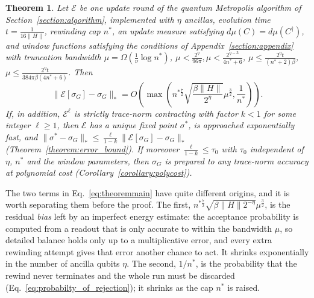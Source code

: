 \documentclass[aps,floatfix,10pt,amssymb,amsfont,amsmath,superscriptaddress,float,nofootinbib,longbibliography,nobalancelastpage,twocolumn]{revtex4-2}
\newtheorem{theorem}{Theorem}
\begin{document}
\begin{theorem}
\label{theorem:main}
Let $\mathcal{E}$ be one update round of the quantum Metropolis algorithm of Section~\ref{section:algorithm}, implemented with $\eta$ ancillas, evolution time $t = \frac{1}{16\|H\|}$, rewinding cap $n^*$, an update measure satisfying $d\mu(C)=d\mu(C^{\dagger})$, and window functions satisfying the conditions of Appendix~\ref{section:appendix} with truncation bandwidth $\mu = \Omega(\frac{1}{\nu}\log n^*)$, $\mu < \frac{2^{\eta}}{96\pi}, \mu < \frac{2^{\eta-3}}{4n^*+6}$, $\mu \leq \frac{2^{\eta}t}{(n^*+2)\beta}$, $\mu \leq \frac{2^{\eta}t}{384\pi\beta(4n^*+6)}$. Then
\begin{equation}
   \|\mathcal{E}[\sigma_G] - \sigma_G\|_* = O\left(\max\left( n^{*\frac{7}{2}}\sqrt{\frac{\beta\|H\| }{2^{\eta}}}\mu^{\frac{3}{2}},\frac{1}{n^*}\right)\right).
\label{eq:theoremmain}
\end{equation}
If, in addition, $\mathcal{E}^{\ell}$ is strictly trace-norm contracting with factor $k<1$ for some integer $\ell\geq1$, then $\mathcal{E}$ has a unique fixed point $\sigma^*$, is approached exponentially fast, and $\|\sigma^*-\sigma_G\|_* \leq \frac{\ell}{1-k}\|\mathcal{E}[\sigma_G] - \sigma_G\|_*$ (Theorem~\ref{theorem:error_bound}). If moreover $\frac{\ell}{1-k}\leq\tau_0$ with $\tau_0$ independent of $\eta$, $n^*$ and the window parameters, then $\sigma_G$ is prepared to any trace-norm accuracy at polynomial cost (Corollary~\ref{corollary:polycost}).
\end{theorem}

The two terms in Eq.~\eqref{eq:theoremmain} have quite different origins, and it is worth separating them before the proof. The first, $n^{*\frac{7}{2}}\sqrt{\beta\|H\|2^{-\eta}}\mu^{\frac{3}{2}}$, is the residual \emph{bias} left by an imperfect energy estimate: the acceptance probability is computed from a readout that is only accurate to within the bandwidth $\mu$, so detailed balance holds only up to a multiplicative error, and every extra rewinding attempt gives that error another chance to act. It shrinks exponentially in the number of ancilla qubits $\eta$. The second, $1/n^*$, is the probability that the rewind never terminates and the whole run must be discarded (Eq.~\eqref{eq:probabilty_of_rejection}); it shrinks as the cap $n^*$ is raised.
\end{document}
